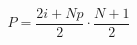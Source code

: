 \documentclass[preview]{standalone}
\begin{document}
\begin{align*}
P = \dfrac{2i+Np}{2}\cdot\dfrac{N+1}2
\end{align*}
\end{document}
